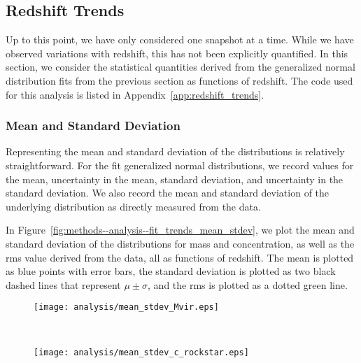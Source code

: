 \subsection{Redshift Trends}
\label{subsec:analysis--redshift_trends}


Up to this point, we have only considered one snapshot at a time.  While we have observed variations with redshift, this has not been explicitly quantified.  In this section, we consider the statistical quantities derived from the generalized normal distribution fits from the previous section as functions of redshift.  The code used for this analysis is listed in Appendix~\ref{app:redshift_trends}.



\subsubsection{Mean and Standard Deviation}
\label{subsubsec:analysis--redshift_trends--mean_stdev}


Representing the mean and standard deviation of the distributions is relatively straightforward.  For the fit generalized normal distributions, we record values for the mean, uncertainty in the mean, standard deviation, and uncertainty in the standard deviation.  We also record the mean and standard deviation of the underlying distribution as directly measured from the data.

In Figure~\ref{fig:methods--analysis--fit_trends_mean_stdev}, we plot the mean and standard deviation of the distributions for mass and concentration, as well as the rms value derived from the data, all as functions of redshift.  The mean is plotted as blue points with error bars, the standard deviation is plotted as two black dashed lines that represent $\mu \pm \sigma$, and the rms is plotted as a dotted green line.

\begin{figure*}[tp]
	\centering
	\begin{subfigure}{}
		\texttt{[image: analysis/mean\_stdev\_Mvir.eps]}
	\end{subfigure}
	\\
	\begin{subfigure}{}
		\texttt{[image: analysis/mean\_stdev\_c\_rockstar.eps]}
	\end{subfigure}
	\caption[Mean, standard deviation, and rms as functions of redshift for generalized normal fits]{\footnotesize Mean, standard deviation, and rms as functions of redshift for $\Delta M_{\mathrm{vir}}$ (\textit{top}) and $\Delta c$ (\textit{bottom}).  The mean is plotted as blue points, $\mu \pm \sigma$ is plotted as the black dashed curves, and rms values are plotted as a green dotted curve.  The red dashed line is a linear fit to the mean.}
	\label{fig:methods--analysis--fit_trends_mean_stdev}
\end{figure*}

